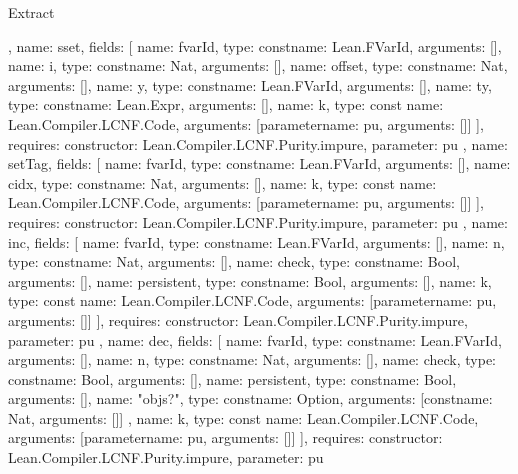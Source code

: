 \begin{lexlean}{Extract}
\begin{toolingmodule}
{{{        },
        {
          name: sset,
          fields: [
            {name: fvarId, type: const{name: Lean.FVarId, arguments: []}},
            {name: i, type: const{name: Nat, arguments: []}},
            {name: offset, type: const{name: Nat, arguments: []}},
            {name: y, type: const{name: Lean.FVarId, arguments: []}},
            {name: ty, type: const{name: Lean.Expr, arguments: []}},
            {
              name: k,
              type: const{
                name: Lean.Compiler.LCNF.Code,
                arguments: [parameter{name: pu, arguments: []}]
              }
            }
          ],
          requires: {constructor: Lean.Compiler.LCNF.Purity.impure, parameter: pu}
        },
        {
          name: setTag,
          fields: [
            {name: fvarId, type: const{name: Lean.FVarId, arguments: []}},
            {name: cidx, type: const{name: Nat, arguments: []}},
            {
              name: k,
              type: const{
                name: Lean.Compiler.LCNF.Code,
                arguments: [parameter{name: pu, arguments: []}]
              }
            }
          ],
          requires: {constructor: Lean.Compiler.LCNF.Purity.impure, parameter: pu}
        },
        {
          name: inc,
          fields: [
            {name: fvarId, type: const{name: Lean.FVarId, arguments: []}},
            {name: n, type: const{name: Nat, arguments: []}},
            {name: check, type: const{name: Bool, arguments: []}},
            {name: persistent, type: const{name: Bool, arguments: []}},
            {
              name: k,
              type: const{
                name: Lean.Compiler.LCNF.Code,
                arguments: [parameter{name: pu, arguments: []}]
              }
            }
          ],
          requires: {constructor: Lean.Compiler.LCNF.Purity.impure, parameter: pu}
        },
        {
          name: dec,
          fields: [
            {name: fvarId, type: const{name: Lean.FVarId, arguments: []}},
            {name: n, type: const{name: Nat, arguments: []}},
            {name: check, type: const{name: Bool, arguments: []}},
            {name: persistent, type: const{name: Bool, arguments: []}},
            {
              name: "objs?",
              type: const{name: Option, arguments: [const{name: Nat, arguments: []}]}
            },
            {
              name: k,
              type: const{
                name: Lean.Compiler.LCNF.Code,
                arguments: [parameter{name: pu, arguments: []}]
              }
            }
          ],
          requires: {constructor: Lean.Compiler.LCNF.Purity.impure, parameter: pu}
}}}
\end{toolingmodule}
\end{lexlean}

